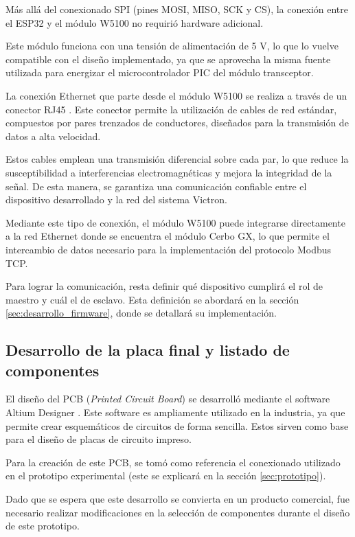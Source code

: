Más allá del conexionado SPI (pines MOSI, MISO, SCK y CS), la conexión
entre el ESP32 y el módulo W5100 no requirió hardware adicional.

Este módulo funciona con una tensión de alimentación de 5 V, lo que lo
vuelve compatible con el diseño implementado, ya que se aprovecha la
misma fuente utilizada para energizar el microcontrolador PIC del
módulo transceptor.

La conexión Ethernet que parte desde el módulo W5100 se realiza a
través de un conector RJ45 \citep{web_rj45}. Este conector permite la utilización de
cables de red estándar, compuestos por pares trenzados de conductores,
diseñados para la transmisión de datos a alta velocidad.

Estos cables emplean una transmisión diferencial sobre cada par, lo que
reduce la susceptibilidad a interferencias electromagnéticas y mejora
la integridad de la señal. De esta manera, se garantiza una comunicación
confiable entre el dispositivo desarrollado y la red del sistema
Victron.

Mediante este tipo de conexión, el módulo W5100 puede integrarse directamente a la red Ethernet donde se encuentra el módulo Cerbo GX, lo que permite el intercambio de datos necesario para la implementación del protocolo Modbus TCP.

Para lograr la comunicación, resta definir qué dispositivo cumplirá el
rol de maestro y cuál el de esclavo. Esta definición se abordará en la
sección \ref{sec:desarrollo_firmware}, donde se detallará su implementación.

\newpage
\subsection{Desarrollo de la placa final y listado de componentes}

El diseño del PCB (\textit{Printed Circuit Board}) se desarrolló mediante el software Altium
Designer \citep{web_altium}. Este software es ampliamente utilizado en la industria, ya
que permite crear esquemáticos de circuitos de forma sencilla. Estos sirven como base para el diseño de placas de circuito
impreso.

Para la creación de este PCB, se tomó como referencia el conexionado
utilizado en el prototipo experimental (este se explicará en la sección \ref{sec:prototipo}).

Dado que se espera que este desarrollo se convierta en un producto
comercial, fue necesario realizar modificaciones en la selección de
componentes durante el diseño de este prototipo.

